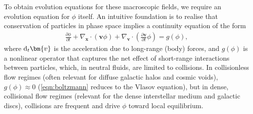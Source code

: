 \documentclass[12pt,twoside]{extreport}
\newcommand{\rbrac}[1]{\left( #1 \right)} %
\newcommand{\mVector}[1]{\bm{#1}} %
\newcommand{\mdd}[1]{\mathrm{d} #1}
\newcommand{\mpp}[1]{\partial #1}
\newcommand{\mppFrac}[2]{\frac{\mpp{#1}}{\mpp{#2}}}
\begin{document}
To obtain evolution equations for these macroscopic fields, we require an evolution equation for $\phi$ itself. An intuitive foundation is to realise that conservation of particles in phase space implies a continuity equation of the form
\begin{align}
    \mppFrac{\phi}{t}
        + \nabla_{\mVector{x}} \cdot \rbrac{\mVector{v} \phi}
        + \nabla_{\mVector{v}} \cdot \rbrac{\mppFrac{\mVector{v}}{t} \phi}
        = g(\phi)
        ,  \label{eqn:boltzmann}
\end{align}
where $\mdd_t \mVector{v}$ is the acceleration due to long-range (body) forces, and $g(\phi)$ is a nonlinear operator that captures the net effect of short-range interactions between particles, which, in neutral fluids, are limited to collisions. In collisionless flow regimes (often relevant for diffuse galactic halos and cosmic voids), $g(\phi) \approx 0$ (\autoref{eqn:boltzmann} reduces to the Vlasov equation), but in dense, collisional flow regimes (relevant for the dense interstellar medium and galactic discs), collisions are frequent and drive $\phi$ toward local equilibrium.
\end{document}

